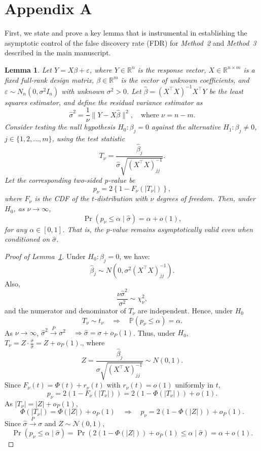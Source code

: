 \documentclass[11pt]{article}
\numberwithin{equation}{section}
\theoremstyle{plain}
\newtheorem{lemma}[theorem]{Lemma}
\theoremstyle{remark}
\begin{document}
\newpage

\section*{Appendix A}

First, we state and prove a key lemma that is instrumental in establishing the asymptotic control of the false discovery rate (FDR) for \textit{Method~2} and \textit{Method~3} described in the main manuscript.

\begin{lemma}
\label{lem:asymptotic_pval}
Let $Y=X\beta+\varepsilon$, where $Y\in \mathbb{R}^n$ is the response vector, $X \in \mathbb{R}^{n \times m}$ is a fixed full-rank design matrix, $\beta \in \mathbb{R}^m$ is the vector of unknown coefficients, and $\varepsilon \sim N_n(0, \sigma^2 I_n)$ with unknown $\sigma^2 > 0$. Let $\hat{\beta} = (X^\top X)^{-1}X^\top Y$ be the least squares estimator, and define the residual variance estimator as
\[
\hat{\sigma}^2 = \frac{1}{\nu} \|Y - X\hat{\beta}\|^2, \quad \text{where } \nu = n - m.
\]
Consider testing the null hypothesis $H_0: \beta_j = 0$ against the alternative $H_1: \beta_j \neq 0$, $j\in \{1,2,...,m\}$, using the test statistic
\[
T_\nu = \frac{\hat{\beta}_j}{\hat{\sigma} \sqrt{(X^\top X)^{-1}_{jj}}}.
\]
Let the corresponding two-sided \textit{p}-value be
\[
p_\nu = 2\left\{1 - F_\nu\left(|T_\nu|\right)\right\},
\]
where $F_\nu$ is the CDF of the $t$-distribution with $\nu$ degrees of freedom. Then, under $H_0$, as $\nu \to \infty$,
\[
\Pr(p_\nu \leq \alpha \mid \hat{\sigma}) = \alpha + o(1),
\]
for any $\alpha \in [0, 1]$. That is, the \textit{p}-value remains asymptotically valid even when conditioned on $\hat{\sigma}$.
\end{lemma}

\begin{proof}[Proof of Lemma~\ref{lem:asymptotic_pval}]

Under $H_0: \beta_j = 0$, we have:
\[
\hat{\beta}_j \sim N\left(0, \sigma^2 (X^\top X)^{-1}_{jj}\right).
\]
Also,
\[
\frac{\nu \hat{\sigma}^2}{\sigma^2} \sim \chi^2_\nu,
\]
and the numerator and denominator of $T_\nu$ are independent. Hence, under $H_0$
\[
T_\nu \sim t_\nu \quad \Rightarrow \quad \mathbb{P}(p_\nu \leq \alpha) = \alpha.
\]
As $\nu \to \infty$, 
\(
\hat{\sigma}^2 \xrightarrow{P} \sigma^2 \quad \Rightarrow \hat{\sigma} = \sigma + o_P(1)
\).
Thus, under $H_0$, \(
T_\nu = Z \cdot \frac{\sigma}{\hat{\sigma}} = Z + o_P(1).
\), where
\[
Z = \frac{\hat{\beta}_j}{\sigma \sqrt{(X^\top X)^{-1}_{jj}}} \sim N(0,1).
\]
Since $F_\nu(t) = \Phi(t) + r_\nu(t)$ with $r_\nu(t) = o(1)$ uniformly in $t$,
\[
p_\nu = 2(1 - F_\nu(|T_\nu|)) = 2(1 - \Phi(|T_\nu|)) + o(1).
\]
As $|T_\nu| = |Z| + o_P(1)$,
\[
\Phi(|T_\nu|) = \Phi(|Z|) + o_P(1) \quad \Rightarrow \quad p_\nu = 2(1 - \Phi(|Z|)) + o_P(1).
\]
Since $\hat{\sigma} \xrightarrow{P} \sigma$ and $Z \sim \mathcal{N}(0,1)$,
\[
\Pr(p_\nu \leq \alpha \mid \hat{\sigma}) = \Pr(2(1 - \Phi(|Z|)) + o_P(1) \leq \alpha \mid \hat{\sigma}) = \alpha + o(1).
\]
\end{proof}
\end{document}
